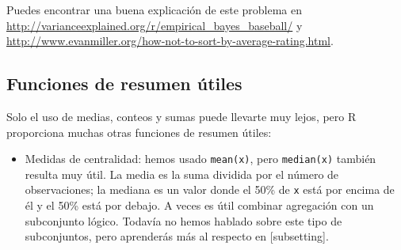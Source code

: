 \documentclass[11pt,oneside]{report}
\newenvironment{Shaded}{\begin{snugshade}}{\end{snugshade}}
\newcommand{\CommentTok}[1]{\textcolor[rgb]{0.56,0.35,0.01}{\textit{#1}}}
\newcommand{\DataTypeTok}[1]{\textcolor[rgb]{0.13,0.29,0.53}{#1}}
\newcommand{\DecValTok}[1]{\textcolor[rgb]{0.00,0.00,0.81}{#1}}
\newcommand{\KeywordTok}[1]{\textcolor[rgb]{0.13,0.29,0.53}{\textbf{#1}}}
\newcommand{\NormalTok}[1]{#1}
\newcommand{\OperatorTok}[1]{\textcolor[rgb]{0.81,0.36,0.00}{\textbf{#1}}}
\newcommand{\StringTok}[1]{\textcolor[rgb]{0.31,0.60,0.02}{#1}}
\providecommand{\tightlist}{%
  \setlength{\itemsep}{0pt}\setlength{\parskip}{0pt}}
\begin{document}
Puedes encontrar una buena explicación de este problema en
\url{http://varianceexplained.org/r/empirical_bayes_baseball/} y
\url{http://www.evanmiller.org/how-not-to-sort-by-average-rating.html}.

\hypertarget{summarise-funs}{%
\subsection{Funciones de resumen útiles}\label{summarise-funs}}

Solo el uso de medias, conteos y sumas puede llevarte muy lejos, pero R
proporciona muchas otras funciones de resumen útiles:

\begin{itemize}
\tightlist
\item
  Medidas de centralidad: hemos usado \texttt{mean(x)}, pero
  \texttt{median(x)} también resulta muy útil. La media es la suma
  dividida por el número de observaciones; la mediana es un valor donde
  el 50\% de \texttt{x} está por encima de él y el 50\% está por debajo.
  A veces es útil combinar agregación con un subconjunto lógico. Todavía
  no hemos hablado sobre este tipo de subconjuntos, pero aprenderás más
  al respecto en {[}subsetting{]}.
\end{itemize}

\begin{Shaded}
\end{Shaded}
\end{document}
